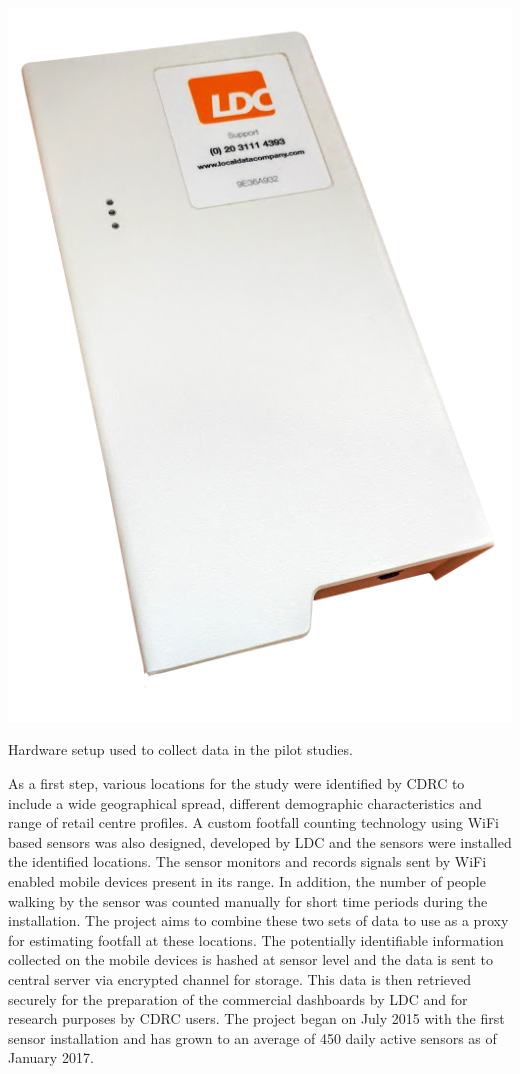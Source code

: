 \begin{marginfigure}[2cm]
  \includegraphics{images/sss-hardware.jpg}
  \caption{Hardware setup used to collect data in the pilot studies.}
  \label{figure:collection:pilot:hardware}
\end{marginfigure}


As a first step, various locations for the study were identified by CDRC to include a wide geographical spread, different demographic characteristics and range of retail centre profiles.
A custom footfall counting technology using WiFi based sensors was also designed, developed by LDC and the sensors were installed the identified locations.
The sensor monitors and records signals sent by WiFi enabled mobile devices present in its range.
In addition, the number of people walking by the sensor was counted manually for short time periods during the installation.
The project aims to combine these two sets of data to use as a proxy for estimating footfall at these locations.
The potentially identifiable information collected on the mobile devices is hashed at sensor level and the data is sent to central server via encrypted channel for storage.
This data is then retrieved securely for the preparation of the commercial dashboards by LDC and for research purposes by CDRC users.
The project began on July 2015 with the first sensor installation and has grown to an average of 450 daily active sensors as of January 2017.


